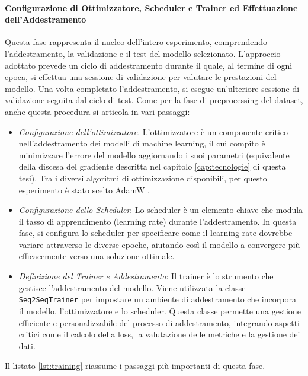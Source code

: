 \documentclass[12pt,a4paper,twoside,openright]{book}
\begin{document}
\paragraph{Configurazione di Ottimizzatore, Scheduler e Trainer ed Effettuazione
dell’Addestramento}
Questa fase rappresenta il nucleo dell'intero esperimento, comprendendo l'addestramento, la validazione e il test del modello selezionato. L'approccio adottato prevede un ciclo di addestramento durante il quale, al termine di ogni epoca, si effettua una sessione di validazione per valutare le prestazioni del modello. Una volta completato l'addestramento, si esegue un'ulteriore sessione di validazione seguita dal ciclo di test. Come per la fase di preprocessing del dataset, anche questa procedura si articola in vari passaggi:
\begin{itemize}
    \item \emph{Configurazione dell'ottimizzatore}.  L'ottimizzatore è un componente critico nell'addestramento dei modelli di machine learning, il cui compito è minimizzare l'errore del modello aggiornando i suoi parametri (equivalente della discesa del gradiente descritta nel capitolo \ref{cap:tecnologie} di questa tesi). Tra i diversi algoritmi di ottimizzazione disponibili, per questo esperimento è stato scelto AdamW \cite{loshchilov2019decoupled}. 
    \item \emph{Configurazione dello Scheduler}: Lo scheduler è un elemento chiave che modula il tasso di apprendimento (learning rate) durante l'addestramento. In questa fase, si configura lo scheduler per specificare come il learning rate dovrebbe variare attraverso le diverse epoche, aiutando così il modello a convergere più efficacemente verso una soluzione ottimale.
    \item \emph{Definizione del Trainer e Addestramento}: Il trainer è lo strumento che gestisce l'addestramento del modello. Viene utilizzata la classe \texttt{Seq2SeqTrainer} per impostare un ambiente di addestramento che incorpora il modello, l'ottimizzatore e lo scheduler. Questa classe permette una gestione efficiente e personalizzabile del processo di addestramento, integrando aspetti critici come il calcolo della loss, la valutazione delle metriche e la gestione dei dati.
\end{itemize}
Il listato \ref{lst:training} riassume i passaggi più importanti di questa fase.
\end{document}
